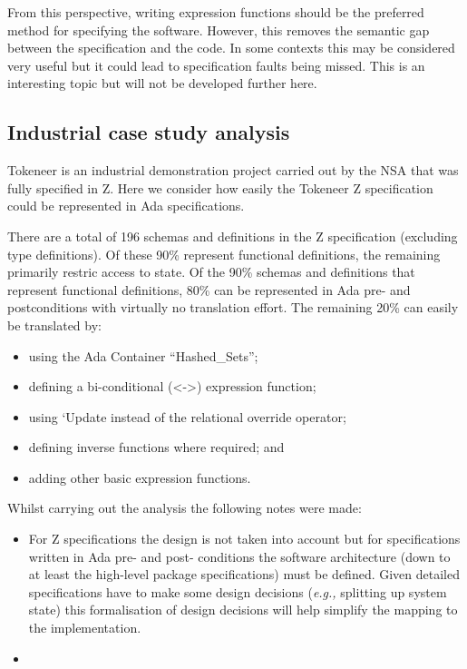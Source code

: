 \documentclass{llncs}
\newcommand{\eg}{\textit{e.g.,}\xspace}
\begin{document}
From this perspective, writing expression functions should be the
preferred method for specifying the software. However, this removes
the semantic gap between the specification and the code. In some
contexts this may be considered very useful but it could lead to
specification faults being missed. This is an interesting topic but
will not be developed further here.

\subsection{Industrial case study analysis}

Tokeneer \cite{tokeneer} is an industrial demonstration project carried
out by the NSA that was fully specified in Z. Here we consider how
easily the Tokeneer Z specification could be represented in Ada
specifications.

There are a total of 196 schemas and definitions in the Z specification 
(excluding type definitions). Of these 90\% represent functional definitions,
the remaining primarily restric access to state. Of the 90\% schemas
and definitions that represent functional definitions, 80\% can be 
represented in Ada pre- and postconditions with virtually no translation
effort. The remaining 20\% can easily be translated by:

\begin{itemize}
  \item using the Ada Container ``Hashed\_Sets'';
  \item defining a bi-conditional (<->) expression function;
  \item using `Update instead of the relational override operator;
  \item defining inverse functions where required; and
  \item adding other basic expression functions.
\end{itemize}

Whilst carrying out the analysis the following notes were made:
\begin{itemize}
   \item For Z specifications the design is not taken into account
         but for specifications written in Ada pre- and post- conditions
         the software architecture (down to at least the high-level
         package specifications) must be defined. Given detailed 
         specifications have to make some design decisions 
         (\eg splitting up system state) this formalisation of
         design decisions will help simplify the mapping to the 
         implementation.
         
   \item 
\end{itemize}
\end{document}
